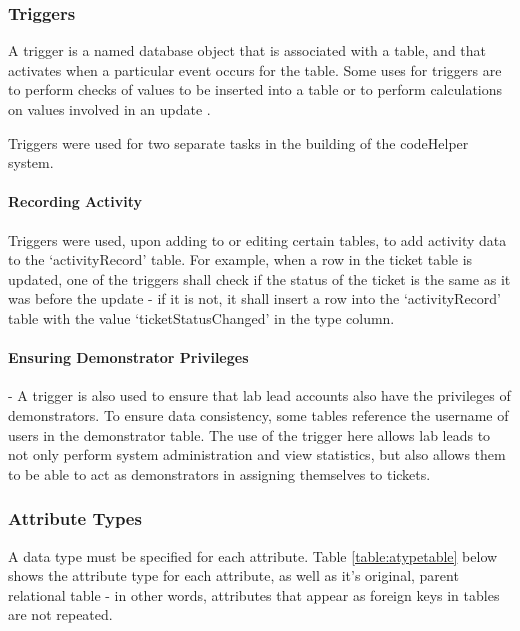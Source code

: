 \subsubsection{Triggers}

A trigger is a named database object that is associated with a table, and that activates when a particular event occurs for the table. Some uses for triggers are to perform checks of values to be inserted into a table or to perform calculations on values involved in an update \cite{trigger}. 

Triggers were used for two separate tasks in the building of the codeHelper system.

\paragraph{Recording Activity}
 Triggers were used, upon adding to or editing certain tables, to add activity data to the `activityRecord' table. For example, when a row in the ticket table is updated, one of the triggers shall check if the status of the ticket is the same as it was before the update - if it is not, it shall insert a row into the `activityRecord' table with the value `ticketStatusChanged' in the type column.

\paragraph{Ensuring Demonstrator Privileges} - A trigger is also used to ensure that lab lead accounts also have the privileges of demonstrators. To ensure data consistency, some tables reference the username of users in the demonstrator table. The use of the trigger here allows lab leads to not only perform system administration and view statistics, but also allows them to be able to act as demonstrators in assigning themselves to tickets.

\subsubsection{Attribute Types}
A data type must be specified for each attribute. Table \ref{table:atypetable} below shows the attribute type for each attribute, as well as it's original, parent relational table - in other words, attributes that appear as foreign keys in tables are not repeated.

